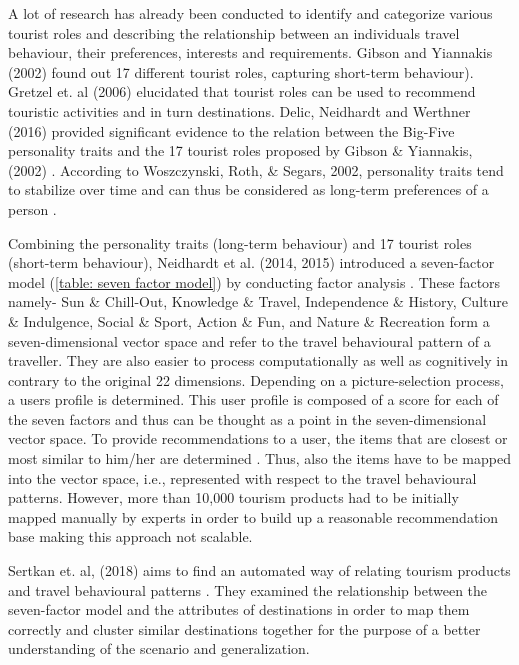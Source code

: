 A lot of research has already been conducted to identify and categorize various tourist roles and describing the relationship between an individual\textquotesingle s travel behaviour, their preferences, interests and requirements. Gibson and Yiannakis (2002) found out 17 different tourist roles, capturing short-term behaviour\cite{gibson2002tourist}). Gretzel et. al (2006) elucidated that tourist roles can be used to recommend touristic activities and in turn destinations\cite{gretzel2006travel}. Delic, Neidhardt and Werthner (2016) provided significant evidence to the relation between the Big-Five personality traits \cite{goldberg1990alternative} and the 17 tourist roles proposed by Gibson \& Yiannakis, (2002) \cite{delic2016sun}. According to Woszczynski, Roth, \& Segars, 2002, personality traits tend to stabilize over time and can thus be considered as long-term preferences of a person \cite{woszczynski2002exploring}.

Combining the personality traits (long-term behaviour) and 17 tourist roles (short-term behaviour), Neidhardt et al. (2014, 2015) introduced a seven-factor model (\ref{table: seven factor model}) by conducting factor analysis\cite{neidhardt2015picture} \cite{neidhardt2014eliciting}. These factors namely- Sun \& Chill-Out, Knowledge \& Travel, Independence \& History, Culture \& Indulgence, Social \& Sport, Action \& Fun, and Nature \& Recreation form a seven-dimensional vector space and refer to the travel behavioural pattern of a traveller. They are also easier to process computationally as well as cognitively in contrary to the original 22 dimensions. Depending on a picture-selection process, a user\textquotesingle s profile is determined. This user profile is composed of a score for each of the seven factors and thus can be thought as a point in the seven-dimensional vector space. To provide recommendations to a user, the items that are closest or most similar to him/her are determined . Thus, also the items have to be mapped into the vector space, i.e., represented with respect to the travel behavioural patterns. However, more than 10,000 tourism products had to be initially mapped manually by experts in order to build up a reasonable recommendation base making this approach not scalable.


Sertkan et. al, (2018) aims to find an automated way of relating tourism products and travel behavioural patterns \cite{sertkan2018mapping}. They examined the relationship between the seven-factor model \cite{neidhardt2015picture}\cite{neidhardt2014eliciting}  and the attributes of destinations in order to map them correctly and cluster similar destinations together for the purpose of a better understanding of the scenario and generalization.



